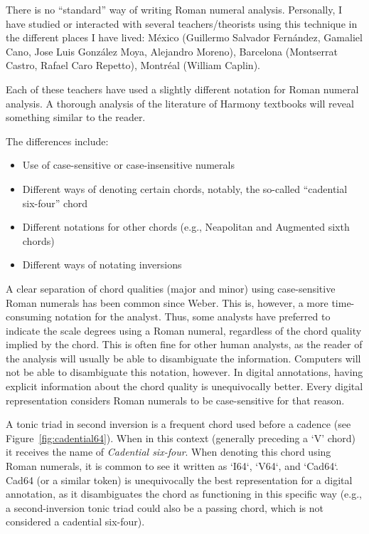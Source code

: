 There is no ``standard'' way of writing Roman numeral analysis.
Personally, I have studied or interacted with several teachers/theorists using this technique in the different places I have lived: M\'exico (Guillermo Salvador Fern\'andez, Gamaliel Cano, Jose Luis Gonz\'alez Moya, Alejandro Moreno), Barcelona (Montserrat Castro, Rafael Caro Repetto), Montr\'eal (William Caplin).

Each of these teachers have used a slightly different notation for Roman numeral analysis.
A thorough analysis of the literature of Harmony textbooks will reveal something similar to the reader.

The differences include:
\begin{itemize}
    \item Use of case-sensitive or case-insensitive numerals
    \item Different ways of denoting certain chords, notably, the so-called ``cadential six-four'' chord
    \item Different notations for other chords (e.g., Neapolitan and Augmented sixth chords)
    \item Different ways of notating inversions
\end{itemize}

A clear separation of chord qualities (major and minor) using case-sensitive Roman numerals has been common since Weber.
This is, however, a more time-consuming notation for the analyst.
Thus, some analysts have preferred to indicate the scale degrees using a Roman numeral, regardless of the chord quality implied by the chord.
This is often fine for other human analysts, as the reader of the analysis will usually be able to disambiguate the information.
Computers will not be able to disambiguate this notation, however.
In digital annotations, having explicit information about the chord quality is unequivocally better.
Every digital representation considers Roman numerals to be case-sensitive for that reason.

A tonic triad in second inversion is a frequent chord used before a cadence (see Figure~\ref{fig:cadential64}).
When in this context (generally preceding a `V' chord) it receives the name of \emph{Cadential six-four}.
When denoting this chord using Roman numerals, it is common to see it written as `I64`, `V64`, and `Cad64`.
Cad64 (or a similar token) is unequivocally the best representation for a digital annotation, as it disambiguates the chord as functioning in this specific way (e.g., a second-inversion tonic triad could also be a passing chord, which is not considered a cadential six-four).

